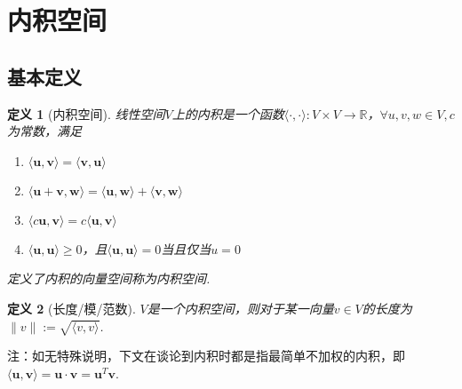 \documentclass[11pt,UTF8]{ctexart}
\newtheorem{definition}{定义}
\newcommand{\inp}[2]{\langle #1,#2 \rangle}
\newcommand{\vb}[1]{\mathbf{#1}}
\begin{document}
\section{内积空间}
\subsection{基本定义}
\begin{definition}[内积空间]
线性空间$V$上的内积是一个函数$\langle\cdot,\cdot\rangle:V\times V\to\mathbb{R}$，$\forall u,v,w\in V,c$为常数，满足
\begin{enumerate}
	\itemsep -3pt
	\item $\langle \mathbf{u},\mathbf{v} \rangle=\langle \mathbf{v},\mathbf{u} \rangle$
	\item $\langle \mathbf{u}+\mathbf{v},\mathbf{w} \rangle=\langle \mathbf{u},\mathbf{w} \rangle+\langle \mathbf{v},\mathbf{w} \rangle$
	\item $\langle c\mathbf{u},\mathbf{v} \rangle=c\langle \mathbf{u},\mathbf{v} \rangle$
	\item $\langle \mathbf{u},\mathbf{u} \rangle\geq 0$，且$\langle \mathbf{u},\mathbf{u} \rangle=0$当且仅当$u=0$
\end{enumerate}
定义了内积的向量空间称为内积空间.
\end{definition}
\begin{definition}[长度/模/范数]
$V$是一个内积空间，则对于某一向量$v\in V$的长度为$\|v\|:=\sqrt{\langle v,v\rangle}$.
\end{definition}
注：如无特殊说明，下文在谈论到内积时都是指最简单不加权的内积，即$\inp{\vb{u}}{\vb{v}}=\vb{u}\cdot\vb{v}=\vb{u}^T\vb{v}$.
\end{document}

